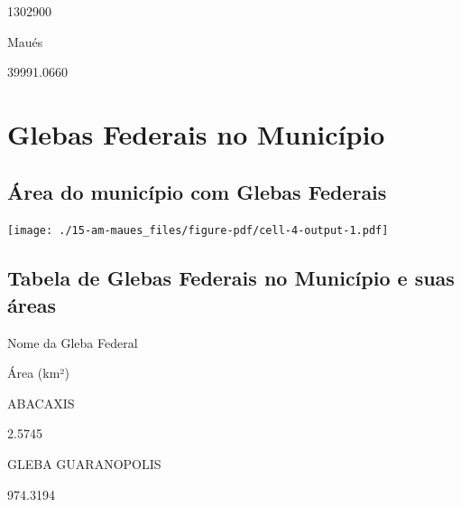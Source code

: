 \documentclass[
  letterpaper,
]{report}
\begin{document}
\n      

1302900

\n      

Maués

\n      

39991.0660

\n    

\n  

\n

\hypertarget{glebas-federais-no-municuxedpio}{%
\section{Glebas Federais no
Município}\label{glebas-federais-no-municuxedpio}}

\hypertarget{uxe1rea-do-municuxedpio-com-glebas-federais}{%
\subsection{Área do município com Glebas
Federais}\label{uxe1rea-do-municuxedpio-com-glebas-federais}}

\texttt{[image: ./15-am-maues\_files/figure-pdf/cell-4-output-1.pdf]}

\hypertarget{tabela-de-glebas-federais-no-municuxedpio-e-suas-uxe1reas}{%
\subsection{Tabela de Glebas Federais no Município e suas
áreas}\label{tabela-de-glebas-federais-no-municuxedpio-e-suas-uxe1reas}}

\n  

\n    

\n      

Nome da Gleba Federal

\n      

Área (km²)

\n    

\n  

\n  

\n    

\n      

ABACAXIS

\n      

2.5745

\n    

\n    

\n      

GLEBA GUARANOPOLIS

\n      

974.3194
\end{document}
